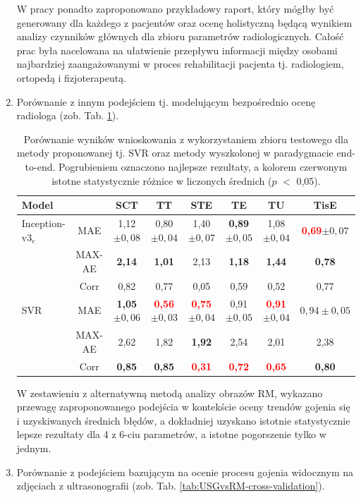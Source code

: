\begin{enumerate}
 W pracy ponadto zaproponowano przykładowy raport, który mógłby być generowany dla każdego z pacjentów oraz ocenę holistyczną będącą wynikiem analizy czynników głównych dla zbioru parametrów radiologicznych. Całość prac była nacelowana na ułatwienie przepływu informacji między osobami najbardziej zaangażowanymi w proces rehabilitacji pacjenta tj. radiologiem, ortopedą i fizjoterapeutą.
 \item Porównanie z innym podejściem tj. modelującym bezpośrednio ocenę radiologa (zob. Tab. \ref{tab:end-to-end_testset}).
 \renewcommand{\arraystretch}{1.2}
 \begin{table}[h!]
 	\caption{Porównanie wyników wnioskowania z wykorzystaniem zbioru testowego dla metody proponowanej tj. SVR oraz metody wyszkolonej w paradygmacie end-to-end. Pogrubieniem oznaczono najlepsze rezultaty, a kolorem czerwonym istotne statystycznie różnice w liczonych średnich ($p$ $<$ 0,05).}
 	\scriptsize
 	\begin{center}
 		\begin{tabular}{lc||c|c|c|c|c|c}
 			\textbf{Model} & & \textbf{SCT} & \textbf{TT} & \textbf{STE} & \textbf{TE} & \textbf{TU} & \textbf{TisE}\\ \hline \hline
 			Inception-v3$_{e}$ & MAE & 1,12$\pm{0,08}$ & 0,80$\pm{0,04}$ & 1,40$\pm{0,07}$ & \textbf{0,89}$\pm{0,05}$ & 1,08$\pm{0,04}$ & \textcolor{red}{\textbf{0,69}}$\pm{0,07}$ \\
 			& MAX-AE & \textbf{2,14} & \textbf{1,01} & 2,13 & \textbf{1,18} & \textbf{1,44} & \textbf{0,78} \\
 			& Corr & 0,82 & 0,77 & 0,05 & 0,59 & 0,52 & 0,77 \\ \hline
 			SVR & MAE & \textbf{1,05}$\pm0,06$ & \textcolor{red}{\textbf{0,56}}$\pm0,03$ & \textcolor{red}{\textbf{0,75}}$\pm0,04$ & 0,91$\pm0,05$ & \textcolor{red}{\textbf{0,91}}$\pm0,04$ & $0,94\pm0,05$\\
 			& MAX-AE & 2,62 & 1,82 & \textbf{1,92} & 2,54 & 2,01 & 2,38 \\
 			& Corr & \textbf{0,85} & \textbf{0,85} & \textcolor{red}{\textbf{0,31}} & \textcolor{red}{\textbf{0,72}} & \textcolor{red}{\textbf{0,65}} & \textbf{0,80} 
 		\end{tabular}
 	\end{center}
 	\label{tab:end-to-end_testset}
 \end{table}
 \renewcommand{\arraystretch}{1}
W zestawieniu z alternatywną metodą analizy obrazów RM, wykazano przewagę zaproponowanego podejścia w kontekście oceny trendów gojenia się i uzyskiwanych średnich błędów, a dokładniej uzyskano istotnie statystycznie lepsze rezultaty dla 4 z 6-ciu parametrów, a istotne pogorszenie tylko w jednym.
 \item Porównanie z podejściem bazującym na ocenie procesu gojenia widocznym na zdjęciach z ultrasonografii (zob. Tab. \ref{tab:USGvsRM-cross-validation}).


\end{enumerate}
